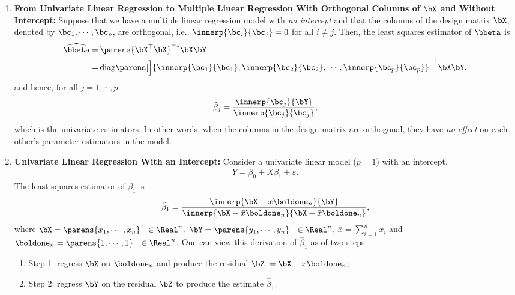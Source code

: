 \documentclass[12pt]{article}
\begin{document}
\begin{enumerate}[label=\textbf{\arabic*.}]
	\item \textbf{From Univariate Linear Regression to Multiple Linear Regression With Orthogonal Columns of $\bX$ and Without Intercept:} Suppose that we have a multiple linear regression model with \emph{no intercept} and that the columns of the design matrix $\bX$, denoted by $\bc_1, \cdots, \bc_p$, are orthogonal, i.e., $\innerp{\bc_i}{\bc_j} = 0$ for all $i \ne j$. Then, the least squares estimator of $\bbeta$ is 
	\begin{align*}
		\widehat{\bbeta} = & \, \parens{\bX^\top \bX}^{-1} \bX \bY \\ 
		= & \, \mathrm{diag} \parens[\Big]{\innerp{\bc_1}{\bc_1}, \innerp{\bc_2}{\bc_2}, \cdots, \innerp{\bc_p}{\bc_p}}^{-1} \bX \bY, 
	\end{align*}
	and hence, for all $j = 1, \cdots, p$
	\begin{align*}
		\hat{\beta}_j = \frac{\innerp{\bc_j}{\bY}}{\innerp{\bc_j}{\bc_j}}, 
	\end{align*}
	which is the univariate estimators. In other words, when the columns in the design matrix are orthogonal, they have \emph{no effect} on each other's parameter estimators in the model. 
	
	\item \textbf{Univariate Linear Regression With an Intercept:} Consider a univariate linear model ($p=1$) with an intercept, 
	\begin{align*}
		Y = \beta_0 + X \beta_1 + \varepsilon. 
	\end{align*}
	The least squares estimator of $\beta_1$ is 
	\begin{align*}
		\hat{\beta}_1 = \frac{\innerp{\bX - \bar{x} \boldone_n}{\bY}}{\innerp{\bX - \bar{x} \boldone_n}{\bX - \bar{x} \boldone_n}}, 
	\end{align*}
	where $\bX = \parens{x_1, \cdots, x_n}^\top \in \Real^n$, $\bY = \parens{y_1, \cdots, y_n}^\top \in \Real^n$, $\bar{x} = \sum_{i=1}^n x_i$ and $\boldone_n = \parens{1, \cdots, 1}^\top \in \Real^n$. One can view this derivation of $\hat{\beta}_1$ as of two steps: 
	\begin{enumerate}
		\item[] Step 1: regress $\bX$ on $\boldone_n$ and produce the residual $\bZ := \bX - \bar{x} \boldone_n$; 
		\item[] Step 2: %
		regress $\bY$ on the residual $\bZ$ to produce the estimate $\hat{\beta}_1$. 
	\end{enumerate}
	

\end{enumerate}
\end{document}
